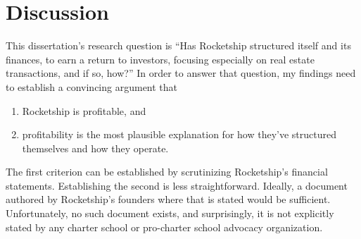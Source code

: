 
\chapter{Discussion}\label{ch:discussion}

\begin{comment}
  With sheer repetition, and in the absence of evidence, a myth about K-12 education has taken hold: American public schools are abject failures. Something must be done to reign in the rapacious unions who protect and coddle incompetent teachers. Something must be done about lazy administrators who block progress. Something must be done to give back to parents control over their children's education. And that something is charter schools.

  Rocketship is one of the most successful charter school chains in the United States, but their success is not in educating elementary school children. Case in point: In August 2023, the Fort Worth Star-Telegram reported that only 23\% of Rocketship's students met state standards in reading and language arts \parencite{Allen.Ruiz2023} compared to 53\% statewide \parencite{TexasEducationAgency2023}.

  Instead, Rocketship's success is in making money.
\end{comment}

This dissertation's research question is ``Has Rocketship structured itself and its finances, to earn a return to investors, focusing especially on real estate transactions, and if so, how?'' In order to answer that question, my findings need to establish a convincing argument that
\begin{enumerate}
  \item Rocketship is profitable, and
  \item profitability is the most plausible explanation for how they've structured themselves and how they operate.
\end{enumerate}

The first criterion can be established by scrutinizing Rocketship's financial statements. Establishing the second is less straightforward. Ideally, a document authored by Rocketship's founders where that is stated would be sufficient. Unfortunately, no such document exists, and surprisingly, it is not explicitly stated by any charter school or pro-charter school advocacy organization.

